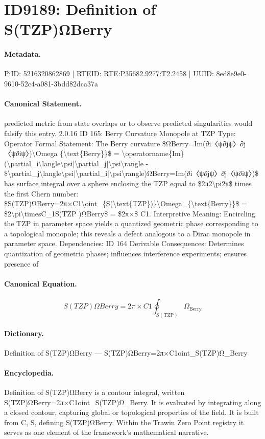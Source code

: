 \section*{ID9189: Definition of S(TZP)ΩBerry}
\paragraph{Metadata.}
PiID: 5216320862869 | RTEID: RTE:P35682.9277:T2.2458 | UUID: 8ed8e9e0-9610-52c4-a081-3bdd82dca37a

\paragraph{Canonical Statement.}
predicted metric from state overlaps or to observe predicted singularities would falsify this entry. 2.0.16 ID 165: Berry Curvature Monopole at TZP Type: Operator Formal Statement: The Berry curvature \$ΩBerry=Im(∂i〈ψ∂jψ〉∂j〈ψ∂iψ〉)\textbackslash{}Omega \{\textbackslash{}text\{Berry\}\}\$ = \textbackslash{}operatorname\{Im\}(\textbackslash{}partial\_i\textbackslash{}langle\textbackslash{}psi|\textbackslash{}partial\_j|\textbackslash{}psi\textbackslash{}rangle - \$\textbackslash{}partial\_j\textbackslash{}langle\textbackslash{}psi|\textbackslash{}partial\_i|\textbackslash{}psi\textbackslash{}rangle)ΩBerry=Im(∂i〈ψ∂jψ〉∂j〈ψ∂iψ〉)\$ has surface integral over a sphere enclosing the TZP equal to \$2π2\textbackslash{}pi2π\$ times the first Chern number: \$S(TZP)ΩBerry=2π×C1\textbackslash{}oint\_\{S(\textbackslash{}text\{TZP\})\}\textbackslash{}Omega\_\{\textbackslash{}text\{Berry\}\}\$ = \$2\textbackslash{}pi\textbackslash{}timesC\_1S(TZP )ΩBerry\$ = \$2π×\$ C1. Interpretive Meaning: Encircling the TZP in parameter space yields a quantized geometric phase corresponding to a topological monopole; this reveals a defect analogous to a Dirac monopole in parameter space. Dependencies: ID 164 Derivable Consequences: Determines quantization of geometric phases; influences interference experiments; ensures presence of

\paragraph{Canonical Equation.}
\[
S(TZP)ΩBerry=2π×C1\oint_{S(\text{TZP})}\Omega_{\text{Berry}}
\]

\paragraph{Dictionary.}
Definition of S(TZP)ΩBerry — S(TZP)ΩBerry=2π×C1oint\_S(TZP)Ω\_Berry

\paragraph{Encyclopedia.}
Definition of S(TZP)ΩBerry is a contour integral, written S(TZP)ΩBerry=2π×C1oint\_S(TZP)Ω\_Berry. It is evaluated by integrating along a closed contour, capturing global or topological properties of the field. It is built from C, S, defining S(TZP)ΩBerry. Within the Trawin Zero Point registry it serves as one element of the framework's mathematical narrative.
